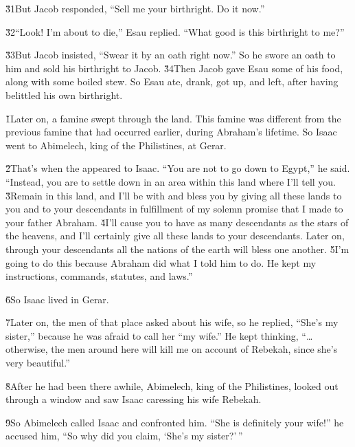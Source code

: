 \v{31}But Jacob responded, ``Sell me your birthright. Do it now.''

\v{32}``Look! I'm about to die,'' Esau replied. ``What good is this birthright to me?''

\v{33}But Jacob insisted, ``Swear it by an oath right now.'' So he swore an oath to him and sold his birthright to Jacob. \v{34}Then Jacob gave Esau some of his food, along with some boiled stew. So Esau ate, drank, got up, and left, after having belittled his own birthright.

\v{1}Later on, a famine swept through the land. This famine was different from the previous famine that had occurred earlier, during Abraham's lifetime. So Isaac went to Abimelech, king of the Philistines, at Gerar.

\v{2}That's when the  appeared to Isaac. ``You are not to go down to Egypt,'' he said. ``Instead, you are to settle down in an area within this land where I'll tell you. \v{3}Remain in this land, and I'll be with and bless you by giving all these lands to you and to your descendants in fulfillment of my solemn promise that I made to your father Abraham. \v{4}I'll cause you to have as many descendants as the stars of the heavens, and I'll certainly give all these lands to your descendants. Later on, through your descendants all the nations of the earth will bless one another. \v{5}I'm going to do this because Abraham did what I told him to do. He kept my instructions, commands, statutes, and laws.''

\v{6}So Isaac lived in Gerar.

\v{7}Later on, the men of that place asked about his wife, so he replied, ``She's my sister,'' because he was afraid to call her ``my wife.'' He kept thinking, ``{\ldots}otherwise, the men around here will kill me on account of Rebekah, since she's very beautiful.''

\v{8}After he had been there awhile, Abimelech, king of the Philistines, looked out through a window and saw Isaac caressing his wife Rebekah.

\v{9}So Abimelech called Isaac and confronted him. ``She is definitely your wife!'' he accused him, ``So why did you claim, `She's my sister?'\,''

